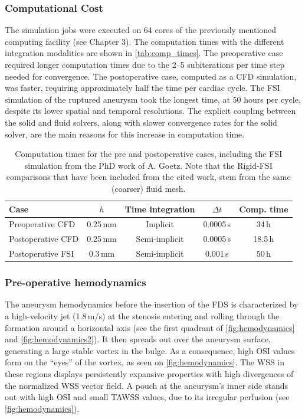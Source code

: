 \subsubsection*{Computational Cost}
The simulation jobs were executed on 64 cores of the previously mentioned computing facility (see Chapter 3). The computation times with the different integration modalities are shown in \autoref{tab:comp_times}. The preoperative case required longer computation times due to the 2--5 subiterations per time step needed for convergence. The postoperative case, computed as a CFD simulation, was faster, requiring approximately half the time per cardiac cycle. The FSI simulation of the ruptured aneurysm took the longest time, at 50 hours per cycle, despite its lower spatial and temporal resolutions. The explicit coupling between the solid and fluid solvers, along with slower convergence rates for the solid solver, are the main reasons for this increase in computation time.
\begin{table}[htb]
	\centering
	\renewcommand{\arraystretch}{1.3}
	\setlength{\tabcolsep}{6pt}
	\begin{tabular}{l c c c c}
		\hline
		Case              & $h$      & Time integration & $\Delta t$ & Comp. time \\
		\hline
		Preoperative CFD  & 0.25\,mm & Implicit         & 0.0005\,s  & 34\,h      \\
		Postoperative CFD & 0.25\,mm & Semi-implicit    & 0.0005\,s  & 18.5\,h    \\
		Postoperative FSI & 0.3\,mm  & Semi-implicit    & 0.001\,s   & 50\,h      \\
		\hline
	\end{tabular}
	\caption[Computation times]{Computation times for the pre and postoperative cases, including the FSI simulation from the PhD work of A. Goetz. Note that the Rigid-FSI comparisons that have been included from the cited work, stem from the same (coarser) fluid mesh.}\label{tab:comp_times}
\end{table}


\subsubsection*{Pre-operative hemodynamics}\label{chap5:sec3:subsec1}
The aneurysm hemodynamics before the insertion of the FDS is characterized by a high-velocity jet (1.8\,m/s) at the stenosis entering and rolling through the formation around a horizontal axis (see the first quadrant of \autoref{fig:hemodynamics} and \autoref{fig:hemodynamics2}). It then spreads out over the aneurysm surface, generating a large stable vortex in the bulge. As a consequence, high OSI values form on the ``eyes'' of the vortex, as seen on \autoref{fig:hemodynamics}. The WSS in these regions displays persistently expansive properties with high divergences of the normalized WSS vector field. A pouch at the aneurysm's inner side stands out with high OSI and small TAWSS values, due to its irregular perfusion (see \autoref{fig:hemodynamics}).

